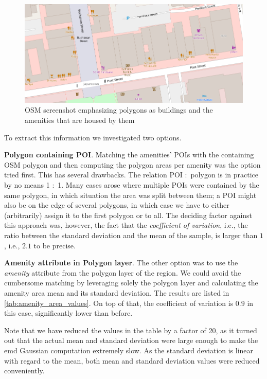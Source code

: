 \begin{figure}[!ht]
	\centering
	\includegraphics[width=\textwidth]{graphics/amenity_polygons4.png}
	\caption{OSM screenshot emphasizing polygons as buildings and the amenities that are housed by them}
	\label{fig:amenity_polygons}
\end{figure}

To extract this information we investigated two options.
\begin{romanlist}
\item \textbf{Polygon containing POI}. 
Matching the amenities' POIs with the containing OSM polygon and then computing the polygon areas per amenity was the option tried first. 
This has several drawbacks. 
The relation POI $\colon$ polygon is in practice by no means 1 $\colon$ 1.
Many cases arose where multiple POIs were contained by the same polygon, in which situation the area was split between them; a POI might also be on the edge of several polygons, in which case we have to either (arbitrarily) assign it to the first polygon or to all. 
The deciding factor against this approach was, however, the fact that the \textit{coefficient of variation}, i.e., the ratio between the standard deviation and the mean of the sample, is larger than $1$, i.e., $2.1$ to be precise.  

\item \textbf{Amenity attribute in Polygon layer}. The other option was to use the \textit{amenity} attribute from the polygon layer of the region. 
We could avoid the cumbersome matching by leveraging solely the polygon layer and calculating the amenity area mean and its standard deviation. The results are listed in \cref{tab:amenity_area_values}. 
On top of that, the coefficient of variation is $0.9$ in this case, significantly lower than before. 

Note that we have reduced the values in the table by a factor of 20, as it turned out that the actual mean and standard deviation were large enough to make the emd Gaussian computation extremely slow. As the standard deviation is linear with regard to the mean, both mean and standard deviation values were reduced conveniently. 

\end{romanlist}

